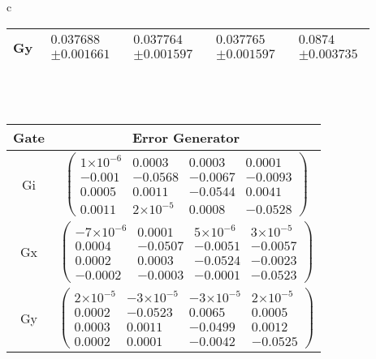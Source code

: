 \documentclass{beamer}
\providecommand{\e}[1]{\ensuremath{\times 10^{#1}}}
\begin{document}
\begin{frame}
\begin{table}[h]
\begin{center}
{\begin{tabular}{c}
\begin{tabular}[l]{|c|c|c|c|c|}
Gy & $ \begin{array}{c} 0.037688 \\ \pm 0.001661 \end{array} $ & $ \begin{array}{c} 0.037764 \\ \pm 0.001597 \end{array} $ & $ \begin{array}{c} 0.037765 \\ \pm 0.001597 \end{array} $ & $ \begin{array}{c} 0.0874 \\ \pm 0.003735 \end{array} $ \\ \hline
\end{tabular}

\\
\vspace{2em}
\\
\begin{tabular}[l]{|c|c|}
\hline
Gate & Error Generator \\ \hline
Gi & $ \left(\!\!\begin{array}{cccc}
1\e{-6} & 0.0003 & 0.0003 & 0.0001 \\ 
-0.001 & -0.0568 & -0.0067 & -0.0093 \\ 
0.0005 & 0.0011 & -0.0544 & 0.0041 \\ 
0.0011 & 2\e{-5} & 0.0008 & -0.0528
 \end{array}\!\!\right) $
 \\ \hline
Gx & $ \left(\!\!\begin{array}{cccc}
-7\e{-6} & 0.0001 & 5\e{-6} & 3\e{-5} \\ 
0.0004 & -0.0507 & -0.0051 & -0.0057 \\ 
0.0002 & 0.0003 & -0.0524 & -0.0023 \\ 
-0.0002 & -0.0003 & -0.0001 & -0.0523
 \end{array}\!\!\right) $
 \\ \hline
Gy & $ \left(\!\!\begin{array}{cccc}
2\e{-5} & -3\e{-5} & -3\e{-5} & 2\e{-5} \\ 
0.0002 & -0.0523 & 0.0065 & 0.0005 \\ 
0.0003 & 0.0011 & -0.0499 & 0.0012 \\ 
0.0002 & 0.0001 & -0.0042 & -0.0525
 \end{array}\!\!\right) $
 \\ \hline
\end{tabular}

\end{tabular}
}
\end{center}
\end{table}

\end{frame}
\end{document}
